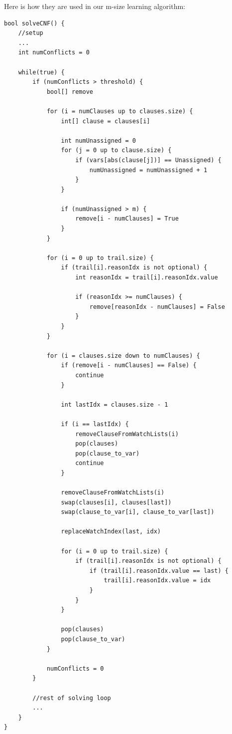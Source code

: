 \documentclass[../main.tex]{subfiles}
\begin{document}
Here is how they are used in our m-size learning algorithm:
\begin{lstlisting}
bool solveCNF() {
    //setup
    ...
    int numConflicts = 0

    while(true) {
        if (numConflicts > threshold) {
            bool[] remove

            for (i = numClauses up to clauses.size) {
                int[] clause = clauses[i]
                
                int numUnassigned = 0
                for (j = 0 up to clause.size) {
                    if (vars[abs(clause[j])] == Unassigned) {
                        numUnassigned = numUnassigned + 1
                    }
                }

                if (numUnassigned > m) {
                    remove[i - numClauses] = True
                }
            }

            for (i = 0 up to trail.size) {
                if (trail[i].reasonIdx is not optional) {
                    int reasonIdx = trail[i].reasonIdx.value

                    if (reasonIdx >= numClauses) {
                        remove[reasonIdx - numClauses] = False
                    }
                }
            }

            for (i = clauses.size down to numClauses) {
                if (remove[i - numClauses] == False) {
                    continue
                }

                int lastIdx = clauses.size - 1

                if (i == lastIdx) {
                    removeClauseFromWatchLists(i)
                    pop(clauses)
                    pop(clause_to_var)
                    continue
                }

                removeClauseFromWatchLists(i)
                swap(clauses[i], clauses[last])
                swap(clause_to_var[i], clause_to_var[last])

                replaceWatchIndex(last, idx)

                for (i = 0 up to trail.size) {
                    if (trail[i].reasonIdx is not optional) {
                        if (trail[i].reasonIdx.value == last) {
                            trail[i].reasonIdx.value = idx
                        }
                    }
                }

                pop(clauses)
                pop(clause_to_var)
            }

            numConflicts = 0
        }

        //rest of solving loop
        ...
    }
} 
\end{lstlisting}
\end{document}

